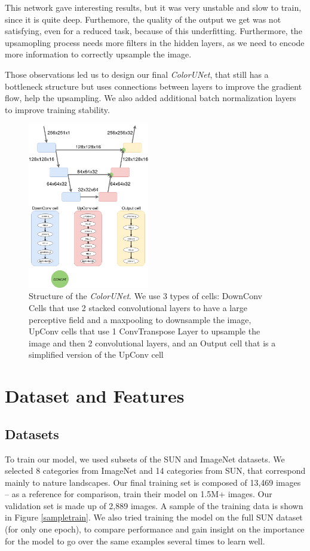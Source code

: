 \documentclass[10pt,twocolumn,letterpaper]{article}
\begin{document}
This network gave interesting results, but it was very unstable and slow to train, since it is quite deep. Furthemore, the quality of the output we get was not satisfying, even for a reduced task, because of this underfitting. Furthermore, the upsamopling process needs more filters in the hidden layers, as we need to encode more information to correctly upsample the image.

Those observations led us to design our final \textit{ColorUNet}, that still has a bottleneck structure but uses connections between layers to improve the gradient flow, help the upsampling. We also added additional batch normalization layers to improve training stability.

\begin{figure}
\begin{center}
\includegraphics[width=200px]{diagram}
\caption{Structure of the \textit{ColorUNet}. We use 3 types of cells: DownConv Cells that use 2 stacked convolutional layers to have a large perceptive field and a maxpooling to downsample the image, UpConv cells that use 1 ConvTranspose Layer to upsample the image and then 2 convolutional layers, and an Output cell that is a simplified version of the UpConv cell}
\label{structure}
\end{center}
\end{figure}

\section{Dataset and Features}

\subsection{Datasets}
To train our model, we used subsets of the SUN \cite{xiao2010sun} and ImageNet \cite{russakovsky2015imagenet} datasets. We selected 8 categories from ImageNet and 14 categories from SUN, that correspond mainly to nature landscapes. Our final training set is composed of 13,469 images -- as a reference for comparison, \cite{zhang2016colorful} train their model on 1.5M+ images. Our validation set is made up of 2,889 images. A sample of the training data is shown in Figure \ref{sampletrain}.
We also tried training the model on the full SUN dataset (for only one epoch), to compare performance and gain insight on the importance for the model to go over the same examples several times to learn well.
\end{document}
